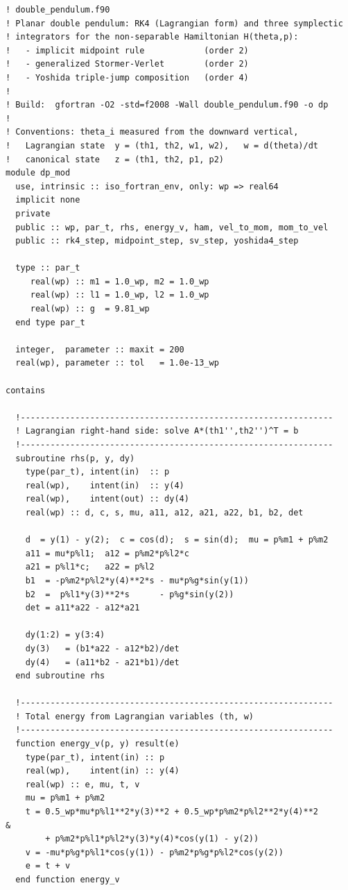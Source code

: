 \documentclass[11pt,a4paper]{book}
\theoremstyle{definition}
\theoremstyle{remark}
\begin{document}
\begin{lstlisting}[language={[95]Fortran},basicstyle=\ttfamily\scriptsize]
! double_pendulum.f90
! Planar double pendulum: RK4 (Lagrangian form) and three symplectic
! integrators for the non-separable Hamiltonian H(theta,p):
!   - implicit midpoint rule            (order 2)
!   - generalized Stormer-Verlet        (order 2)
!   - Yoshida triple-jump composition   (order 4)
!
! Build:  gfortran -O2 -std=f2008 -Wall double_pendulum.f90 -o dp
!
! Conventions: theta_i measured from the downward vertical,
!   Lagrangian state  y = (th1, th2, w1, w2),   w = d(theta)/dt
!   canonical state   z = (th1, th2, p1, p2)
module dp_mod
  use, intrinsic :: iso_fortran_env, only: wp => real64
  implicit none
  private
  public :: wp, par_t, rhs, energy_v, ham, vel_to_mom, mom_to_vel
  public :: rk4_step, midpoint_step, sv_step, yoshida4_step

  type :: par_t
     real(wp) :: m1 = 1.0_wp, m2 = 1.0_wp
     real(wp) :: l1 = 1.0_wp, l2 = 1.0_wp
     real(wp) :: g  = 9.81_wp
  end type par_t

  integer,  parameter :: maxit = 200
  real(wp), parameter :: tol   = 1.0e-13_wp

contains

  !---------------------------------------------------------------
  ! Lagrangian right-hand side: solve A*(th1'',th2'')^T = b
  !---------------------------------------------------------------
  subroutine rhs(p, y, dy)
    type(par_t), intent(in)  :: p
    real(wp),    intent(in)  :: y(4)
    real(wp),    intent(out) :: dy(4)
    real(wp) :: d, c, s, mu, a11, a12, a21, a22, b1, b2, det

    d  = y(1) - y(2);  c = cos(d);  s = sin(d);  mu = p%m1 + p%m2
    a11 = mu*p%l1;  a12 = p%m2*p%l2*c
    a21 = p%l1*c;   a22 = p%l2
    b1  = -p%m2*p%l2*y(4)**2*s - mu*p%g*sin(y(1))
    b2  =  p%l1*y(3)**2*s      - p%g*sin(y(2))
    det = a11*a22 - a12*a21

    dy(1:2) = y(3:4)
    dy(3)   = (b1*a22 - a12*b2)/det
    dy(4)   = (a11*b2 - a21*b1)/det
  end subroutine rhs

  !---------------------------------------------------------------
  ! Total energy from Lagrangian variables (th, w)
  !---------------------------------------------------------------
  function energy_v(p, y) result(e)
    type(par_t), intent(in) :: p
    real(wp),    intent(in) :: y(4)
    real(wp) :: e, mu, t, v
    mu = p%m1 + p%m2
    t = 0.5_wp*mu*p%l1**2*y(3)**2 + 0.5_wp*p%m2*p%l2**2*y(4)**2        &
        + p%m2*p%l1*p%l2*y(3)*y(4)*cos(y(1) - y(2))
    v = -mu*p%g*p%l1*cos(y(1)) - p%m2*p%g*p%l2*cos(y(2))
    e = t + v
  end function energy_v


\end{lstlisting}
\end{document}

